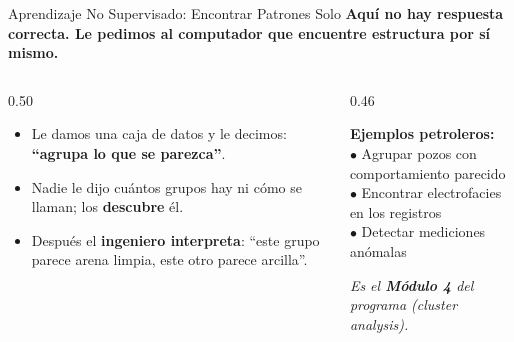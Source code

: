 \documentclass[aspectratio=169, 11pt]{beamer}
\begin{document}
\begin{frame}{Aprendizaje No Supervisado: Encontrar Patrones Solo}
  \vspace{-6pt}
  {\small\color{arcaDark}\bfseries
    Aquí \textbf{no hay respuesta correcta}. Le pedimos al computador que encuentre estructura por sí mismo.}

  \vspace{8pt}
  \begin{columns}[T]
    \begin{column}{0.50\textwidth}
      {\footnotesize\color{textMuted}
      \begin{itemize}\setlength{\itemsep}{6pt}
        \item[{\color{arcaRed}\scriptsize\faLayerGroup}]
          Le damos una caja de datos y le decimos:
          \textbf{``agrupa lo que se parezca''}.
        \item[{\color{arcaRed}\scriptsize\faQuestion}]
          Nadie le dijo cuántos grupos hay ni cómo se llaman;
          los \textbf{descubre} él.
        \item[{\color{arcaRed}\scriptsize\faUserCog}]
          Después el \textbf{ingeniero interpreta}: ``este grupo
          parece arena limpia, este otro parece arcilla''.
      \end{itemize}
      }
    \end{column}
    \begin{column}{0.46\textwidth}
      \begin{tcolorbox}[colback=arcaGray, colframe=codeBlue, boxrule=0pt, leftrule=3pt,
        arc=3pt, left=6pt, right=6pt, top=5pt, bottom=5pt]
        {\scriptsize\color{arcaDark}\bfseries Ejemplos petroleros:}\\[4pt]
        {\scriptsize\color{textMuted}
          \(\bullet\) Agrupar pozos con comportamiento parecido\\[2pt]
          \(\bullet\) Encontrar electrofacies en los registros\\[2pt]
          \(\bullet\) Detectar mediciones anómalas}
      \end{tcolorbox}
      \vspace{5pt}
      {\scriptsize\color{arcaDark}\itshape
        Es el \textbf{Módulo 4} del programa
        (\textit{cluster analysis}).}
    \end{column}
  \end{columns}
\end{frame}
\end{document}
